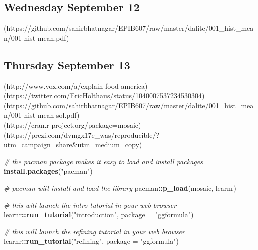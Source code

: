 \documentclass[]{book}
\makeatletter
\newenvironment{Shaded}{\begin{snugshade}}{\end{snugshade}}
\newcommand{\KeywordTok}[1]{\textcolor[rgb]{0.13,0.29,0.53}{\textbf{#1}}}
\newcommand{\DataTypeTok}[1]{\textcolor[rgb]{0.13,0.29,0.53}{#1}}
\newcommand{\StringTok}[1]{\textcolor[rgb]{0.31,0.60,0.02}{#1}}
\newcommand{\CommentTok}[1]{\textcolor[rgb]{0.56,0.35,0.01}{\textit{#1}}}
\newcommand{\OperatorTok}[1]{\textcolor[rgb]{0.81,0.36,0.00}{\textbf{#1}}}
\newcommand{\NormalTok}[1]{#1}
\let\originaltabular\tabular
\let\endoriginaltabular\endtabular
\renewenvironment{tabular}[1]{%
  \begingroup%
  \centering%
  \originaltabular{#1}}%
  {\endoriginaltabular\endgroup}
\newenvironment{kframe}{%
\medskip{}
\setlength{\fboxsep}{.8em}
 \def\at@end@of@kframe{}%
 \ifinner\ifhmode%
  \def\at@end@of@kframe{\end{minipage}}%
  \begin{minipage}{\columnwidth}%
 \fi\fi%
 \def\FrameCommand##1{\hskip\@totalleftmargin \hskip-\fboxsep
 \colorbox{shadecolor}{##1}\hskip-\fboxsep
     \hskip-\linewidth \hskip-\@totalleftmargin \hskip\columnwidth}%
 \MakeFramed {\advance\hsize-\width
   \@totalleftmargin\z@ \linewidth\hsize
   \@setminipage}}%
 {\par\unskip\endMakeFramed%
 \at@end@of@kframe}
\renewenvironment{Shaded}{\begin{kframe}}{\end{kframe}}
\theoremstyle{definition}
\theoremstyle{definition}
\theoremstyle{definition}
\theoremstyle{remark}
\makeatother
\begin{document}
\subsection{Wednesday September 12}\label{wednesday-september-12}

\begin{table}[H]
\centering
\begin{tabular}{l}
(https://github.com/sahirbhatnagar/EPIB607/raw/master/dalite/001\_hist\_mean/001-hist-mean.pdf)\\
\hline
\end{tabular}
\end{table}

\subsection{Thursday September 13}\label{thursday-september-13}

\begin{table}[H]
\centering
\begin{tabular}{l}
(http://www.vox.com/a/explain-food-america)\\
(https://twitter.com/EricHolthaus/status/1040007537234530304)\\
(https://github.com/sahirbhatnagar/EPIB607/raw/master/dalite/001\_hist\_mean/001-hist-mean-sol.pdf)\\
(https://cran.r-project.org/package=mosaic)\\
(https://prezi.com/dvmgx17e\_was/reproducible/?utm\_campaign=share\&utm\_medium=copy)\\
\hline
\end{tabular}
\end{table}

\begin{Shaded}
\begin{Highlighting}[]
\CommentTok{# the pacman package makes it easy to load and install packages}
\KeywordTok{install.packages}\NormalTok{(}\StringTok{"pacman"}\NormalTok{)}

\CommentTok{# pacman will install and load the library}
\NormalTok{pacman}\OperatorTok{::}\KeywordTok{p_load}\NormalTok{(mosaic, learnr)}

\CommentTok{# this will launch the intro tutorial in your web browser}
\NormalTok{learnr}\OperatorTok{::}\KeywordTok{run_tutorial}\NormalTok{(}\StringTok{"introduction"}\NormalTok{, }\DataTypeTok{package =} \StringTok{"ggformula"}\NormalTok{)}

\CommentTok{# this will launch the refining tutorial in your web browser}
\NormalTok{learnr}\OperatorTok{::}\KeywordTok{run_tutorial}\NormalTok{(}\StringTok{"refining"}\NormalTok{, }\DataTypeTok{package =} \StringTok{"ggformula"}\NormalTok{)}
\end{Highlighting}
\end{Shaded}
\end{document}
